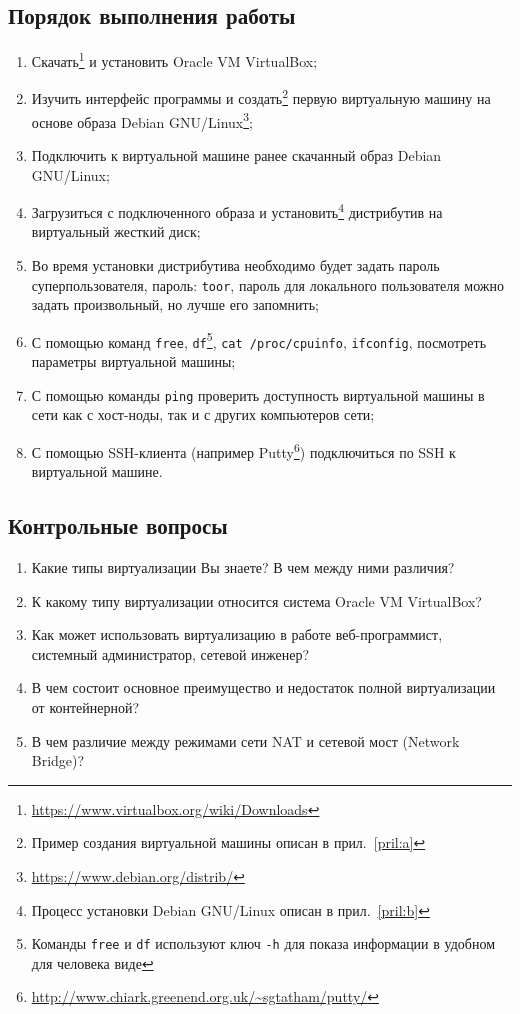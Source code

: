 \subsection{Порядок выполнения работы}

\begin{enumerate}
    \item Скачать\footnote{\url{https://www.virtualbox.org/wiki/Downloads}} и установить Oracle VM VirtualBox;
    \item Изучить интерфейс программы и создать\footnote{Пример создания виртуальной машины описан в прил.~\ref{pril:a}} первую виртуальную машину на основе образа Debian GNU/Linux\footnote{\url{https://www.debian.org/distrib/}};
    \item Подключить к виртуальной машине ранее скачанный образ Debian GNU/Linux;
    \item Загрузиться с подключенного образа и установить\footnote{Процесс установки Debian GNU/Linux описан в прил.~\ref{pril:b}} дистрибутив на виртуальный жесткий диск;
    \item Во время установки дистрибутива необходимо будет задать пароль суперпользователя, пароль: \texttt{toor}, пароль для локального пользователя можно задать произвольный, но лучше его запомнить;
    \item С помощью команд \texttt{free}, \texttt{df}\footnote{Команды \texttt{free} и \texttt{df} используют ключ \texttt{-h} для показа информации в удобном для человека виде}, \texttt{cat /proc/cpuinfo}, \texttt{ifconfig}, посмотреть параметры виртуальной машины;
    \item С помощью команды \texttt{ping} проверить доступность виртуальной машины в сети как с хост-ноды, так и с других компьютеров сети;
    \item С помощью SSH-клиента (например Putty\footnote{\url{http://www.chiark.greenend.org.uk/~sgtatham/putty/}}) подключиться по SSH к виртуальной машине.
\end{enumerate}

\subsection{Контрольные вопросы}
\begin{enumerate}
    \item Какие типы виртуализации Вы знаете? В чем между ними различия?
    \item К какому типу виртуализации относится система Oracle VM VirtualBox?
    \item Как может использовать виртуализацию в работе веб-программист, системный администратор, сетевой инженер?
    \item В чем состоит основное преимущество и недостаток полной виртуализации от контейнерной?
    \item В чем различие между режимами сети NAT и сетевой мост (Network Bridge)?
\end{enumerate}

\clearpage
